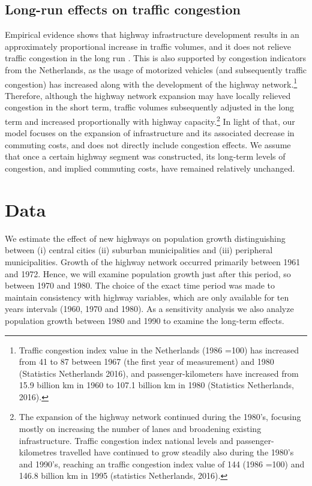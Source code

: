 \documentclass[a4paper,authoryear,review]{elsarticle}  	%
\begin{document}
\subsection{Long-run effects on traffic congestion}
	Empirical evidence shows that highway infrastructure development results in an approximately proportional increase in traffic volumes, and it does not relieve traffic congestion in the long run \citep{Duranton2011}. This is also supported by congestion indicators from the Netherlands, as the usage of motorized vehicles (and subsequently traffic congestion) has increased along with the development of the highway network.\footnote{Traffic congestion index value in the Netherlands (1986 =100) has increased from 41 to 87 between 1967 (the first year of measurement) and 1980 (Statistics Netherlands 2016), and passenger-kilometers have increased from 15.9 billion km in 1960 to 107.1 billion km in 1980 (Statistics Netherlands, 2016).}
	Therefore, although the highway network expansion may have locally relieved congestion in the short term, traffic volumes subsequently adjusted in the long term and increased proportionally with highway capacity.\footnote{The expansion of the highway network continued during the 1980's, focusing mostly on increasing the number of lanes and broadening existing infrastructure. Traffic congestion index national levels and passenger-kilometres travelled have continued to grow steadily also during the 1980’s and 1990’s, reaching an traffic congestion index value of 144 (1986 =100) and 146.8 billion km in 1995 (statistics Netherlands, 2016).} In light of that, our model focuses on the expansion of infrastructure and its associated decrease in commuting costs, and does not directly include congestion effects. We assume that once a certain highway segment was constructed, its long-term levels of congestion, and implied commuting costs, have remained relatively unchanged. 
				 

\section{Data}
	We estimate the effect of new highways on population growth distinguishing between (i) central cities (ii) suburban municipalities and (iii) peripheral municipalities. Growth of the highway network occurred primarily between 1961 and 1972. Hence, we will examine population growth just after this period, so between 1970 and 1980. 
	The choice of the exact time period was made to maintain consistency with highway variables, which are only available for ten years intervals (1960, 1970 and 1980). As a sensitivity analysis we also analyze population growth between 1980 and 1990 to examine the long-term effects. 
	
\end{document}
